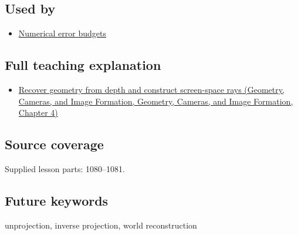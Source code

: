 \subsection{Used by}\label{appendix-2cbf2968e866-used-by}

\begin{itemize}
\tightlist
\item
  \hyperref[appendix-31b8c295e05f]{Numerical error budgets}
\end{itemize}

\subsection{Full teaching explanation}\label{appendix-2cbf2968e866-full-teaching-explanation}

\begin{itemize}
\tightlist
\item
  \href{../03-Geometry-Cameras-and-Image-Formation/main.pdf\#nameddest=02-foundations-ii-ch035-recover-geometry-from-depth-and-construct-screen-space-rays}{Recover geometry from depth and construct screen-space rays (Geometry, Cameras, and Image Formation, Geometry, Cameras, and Image Formation, Chapter 4)}
\end{itemize}

\subsection{Source coverage}\label{appendix-2cbf2968e866-source-coverage}

Supplied lesson parts: 1080--1081.

\subsection{Future keywords}\label{appendix-2cbf2968e866-future-keywords}

unprojection, inverse projection, world reconstruction
